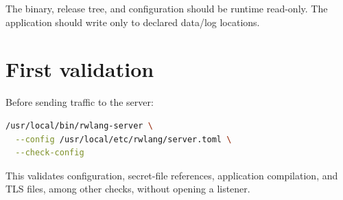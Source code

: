 The binary, release tree, and configuration should be runtime read-only. The application should write only to declared data/log locations.

\section{First validation}

Before sending traffic to the server:

\begin{lstlisting}[language=bash]
/usr/local/bin/rwlang-server \
  --config /usr/local/etc/rwlang/server.toml \
  --check-config
\end{lstlisting}

This validates configuration, secret-file references, application compilation, and TLS files, among other checks, without opening a listener.
